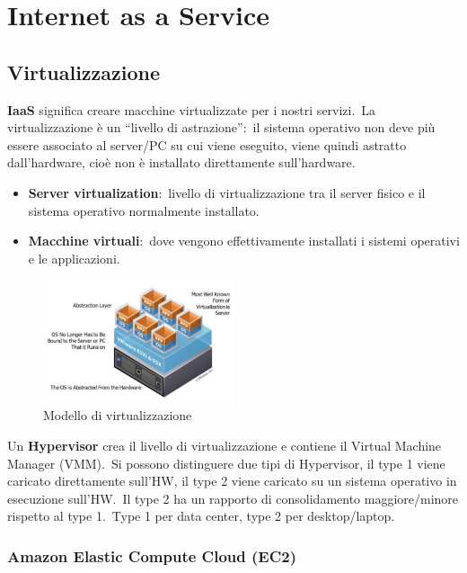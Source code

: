 \chapter{Internet as a Service}
\section{Virtualizzazione}
\textbf{IaaS} significa creare macchine virtualizzate per i nostri servizi.\
La virtualizzazione è un ``livello di astrazione'':\ il sistema operativo non deve più essere associato al server/PC su cui viene eseguito, viene quindi astratto dall'hardware, cioè non è installato direttamente sull'hardware.\
\begin{itemize}
    \item \textbf{Server virtualization}:\ livello di virtualizzazione tra il server fisico e il sistema operativo normalmente installato.
    \item \textbf{Macchine virtuali}:\ dove vengono effettivamente installati i sistemi operativi e le applicazioni.
\end{itemize}

\begin{figure}[H]
    \centering
    \includegraphics [width=0.5\textwidth]{immagini/model_virtualization.png}
    \caption*{Modello di virtualizzazione}
    \label{fig:model_virtualization}
\end{figure}

\noindent Un \textbf{Hypervisor} crea il livello di virtualizzazione e contiene il Virtual Machine Manager (VMM).\
Si possono distinguere due tipi di Hypervisor, il type 1 viene caricato direttamente sull'HW, il type 2 viene caricato su un sistema operativo in esecuzione sull'HW.\
Il type 2 ha un rapporto di consolidamento maggiore/minore rispetto al type 1.\
Type 1 per data center, type 2 per desktop/laptop.

\subsection{Amazon Elastic Compute Cloud (EC2)}

